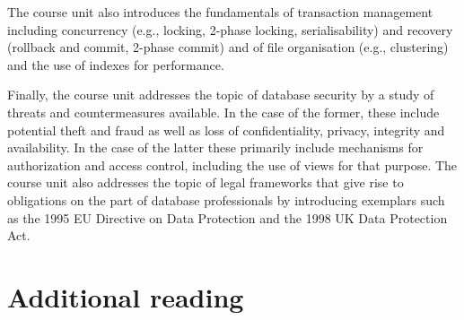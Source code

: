 The course unit also introduces the fundamentals of transaction management
including concurrency (e.g., locking, 2-phase locking, serialisability) and
recovery (rollback and commit, 2-phase commit) and of file organisation (e.g.,
clustering) and the use of indexes for performance.

Finally, the course unit addresses the topic of database security by a study of
threats and countermeasures available. In the case of the former, these include
potential theft and fraud as well as loss of confidentiality, privacy, integrity
and availability. In the case of the latter these primarily include mechanisms
for authorization and access control, including the use of views for that
purpose. The course unit also addresses the topic of legal frameworks that give
rise to obligations on the part of database professionals by introducing
exemplars such as the 1995 EU Directive on Data Protection and the 1998 UK Data
Protection Act.

\section*{Additional reading}


